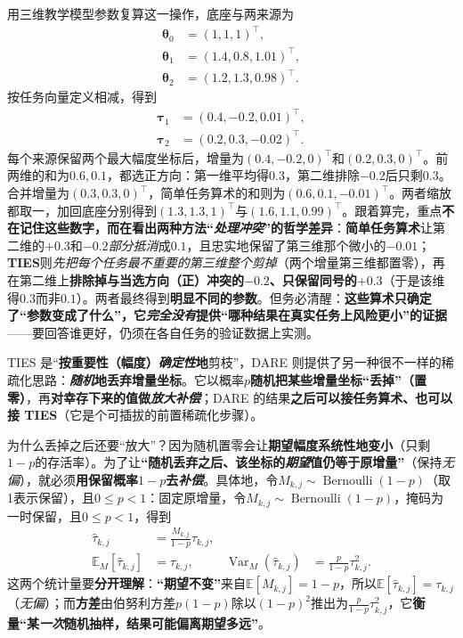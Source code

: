 用三维教学模型参数复算这一操作，底座与两来源为
\[
  \begin{aligned}
    \bm{\theta}_0&=(1,1,1)^\top,\\
    \bm{\theta}_1&=(1.4,0.8,1.01)^\top,\\
    \bm{\theta}_2&=(1.2,1.3,0.98)^\top.
  \end{aligned}
\]
按任务向量定义相减，得到
\[
  \begin{aligned}
    \bm{\tau}_1&=(0.4,-0.2,0.01)^\top,\\
    \bm{\tau}_2&=(0.2,0.3,-0.02)^\top.
  \end{aligned}
\]
每个来源保留两个最大幅度坐标后，增量为$(0.4,-0.2,0)^\top$和$(0.2,0.3,0)^\top$。前两维的和为$0.6,0.1$，都选正方向：第一维平均得$0.3$，第二维排除$-0.2$后只剩$0.3$。合并增量为$(0.3,0.3,0)^\top$，简单任务算术的和则为$(0.6,0.1,-0.01)^\top$。两者缩放都取一，加回底座分别得到$(1.3,1.3,1)^\top$与$(1.6,1.1,0.99)^\top$。跟着算完，重点\textbf{不在记住这些数字，而在看出两种方法“\emph{处理冲突}”的哲学差异}：\textbf{简单任务算术}让第二维的$+0.3$和$-0.2$\emph{部分抵消}成$0.1$，且忠实地保留了第三维那个微小的$-0.01$；\textbf{TIES}则\emph{先把每个任务最不重要的第三维整个剪掉}（两个增量第三维都置零），再在第二维上\textbf{排除掉与当选方向（正）冲突的}$-0.2$\textbf{、只保留同号的}$+0.3$（于是该维得$0.3$而非$0.1$）。两者最终得到\textbf{明显不同的参数}。但务必清醒：\textbf{这些算术只确定了“参数变成了什么”，它\emph{完全没有}提供“哪种结果在真实任务上风险更小”的证据}——要回答谁更好，仍须在各自任务的验证数据上实测。

TIES 是“\textbf{按重要性（幅度）\emph{确定性}地}剪枝”，DARE 则提供了另一种很不一样的稀疏化思路：\textbf{\emph{随机}地丢弃增量坐标}。它以概率$p$\textbf{随机把某些增量坐标“丢掉”（置零）}，再\textbf{对幸存下来的值做\emph{放大补偿}}；DARE 的结果\textbf{之后可以接任务算术、也可以接 TIES}（它是个可插拔的前置稀疏化步骤）。

为什么丢掉之后还要“放大”？因为随机置零会让\textbf{期望幅度系统性地变小}（只剩$1-p$的存活率）。为了让\textbf{“随机丢弃之后、该坐标的\emph{期望}值仍等于原增量”}（保持\emph{无偏}），就必须\textbf{用保留概率$1-p$去\emph{补偿}}。具体地，令$M_{k,j}\sim\operatorname{Bernoulli}(1-p)$（取1表示保留），且$0\leq p<1$：固定原增量，令$M_{k,j}\sim\operatorname{Bernoulli}(1-p)$，掩码为一时保留，且$0\leq p<1$，得到
\begin{equation}
  \begin{aligned}
    \widehat{\tau}_{k,j}&=\frac{M_{k,j}}{1-p}\tau_{k,j},\\
    \mathbb{E}_M[\widehat{\tau}_{k,j}]&=\tau_{k,j},&
    \operatorname{Var}_M(\widehat{\tau}_{k,j})
      &=\frac{p}{1-p}\tau_{k,j}^{2}.
  \end{aligned}
  \label{eq:ket-integration-dare}
\end{equation}
这两个统计量要\textbf{分开理解}：\textbf{“期望不变”}来自$\mathbb{E}[M_{k,j}]=1-p$，所以$\mathbb{E}[\widehat{\tau}_{k,j}]=\tau_{k,j}$（\emph{无偏}）；而\textbf{方差}由伯努利方差$p(1-p)$除以$(1-p)^2$推出为$\frac{p}{1-p}\tau_{k,j}^2$，它\textbf{衡量“某\emph{一次}随机抽样，结果可能偏离期望多远”}。

